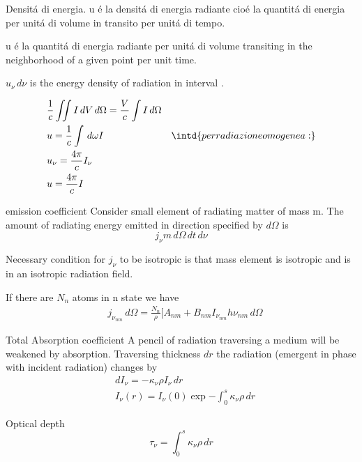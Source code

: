 \begin{definition}{Densit\'a di energia.}
u \'e la densit\'a di energia radiante cio\'e la quantit\'a di energia per unit\'a di volume in transito per unit\'a di tempo.

u \'e la quantit\'a di energia radiante per unit\'a di volume transiting in the neighborhood of a given point per unit time.

$u_{\nu}\,d\nu$ is the energy density of radiation in interval \mblock{[\nu,\nu+\,d\nu]}.

\begin{align*}
&\frac{1}{c}\iint I\,dV\,d\Omega=\frac{V}{c}\int I\,d\Omega\\
&u=\frac{1}{c}\int\,d\omega I&\intd{per radiazione omogenea:}\\
&u_{\nu}=\frac{4\pi}{c}I_{\nu}\\
&u=\frac{4\pi}{c}I
\end{align*}

\end{definition}

\begin{definition}{emission coefficient}
Consider small element of radiating matter of mass m. The amount of radiating energy emitted in direction specified by $d\Omega$ is
\begin{equation*}
j_{\nu}m\,d\Omega\,dt\,d\nu
\end{equation*}

Necessary condition for $j_{\nu}$ to be isotropic is that mass element is isotropic and is in an isotropic radiation field.

If there are $N_n$ atoms in n state we have
\begin{align*}
&j_{\nu_{nm}}\,d\Omega=\frac{N_n}{\rho}[A_{nm}+B_{nm}I_{\nu_{nm}}h\nu_{nm}\,d\Omega
\end{align*}
\end{definition}


\begin{definition}{Total Absorption coefficient}
A pencil of radiation traversing a medium will be weakened by absorption. Traversing thickness $dr$ the radiation (emergent in phase with incident radiation) changes by
\begin{align*}
&dI_{\nu}=-\kappa_{\nu}\rho I_{\nu}\,dr\\
&I_{\nu}(r)=I_{\nu}(0)\exp{-\int_0^s\kappa_{\nu}\rho\,dr}
\end{align*}
\begin{definition}{Optical depth}
\begin{equation*}
\tau_{\nu}=\int_0^s\kappa_{\nu}\rho\,dr
\end{equation*}
\end{definition}

\end{definition}

